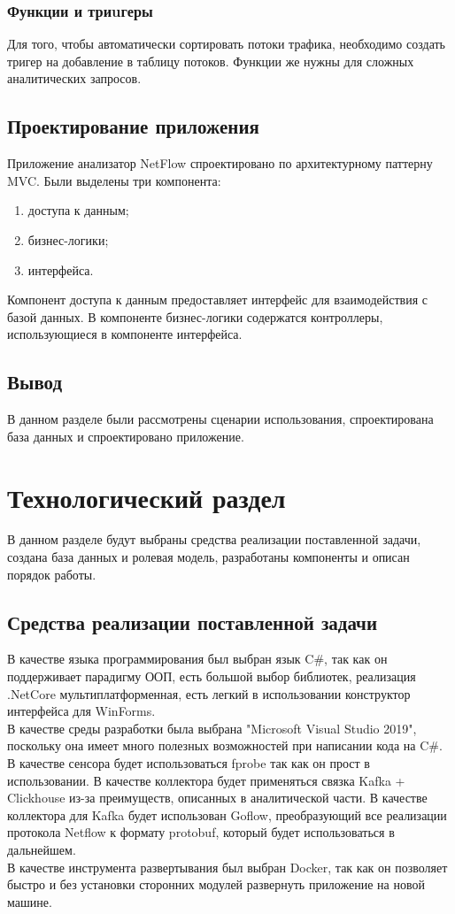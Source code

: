 \subsubsection{Функции и триuгеры}
Для того, чтобы автоматически сортировать потоки трафика, необходимо создать тригер на добавление в таблицу потоков. Функции же нужны для сложных аналитических запросов.

\subsection{Проектирование приложения}
Приложение анализатор NetFlow спроектировано по архитектурному паттерну MVC.
Были выделены три компонента:
\begin{enumerate}
	\item доступа к данным;
	\item бизнес-логики;
	\item интерфейса.
\end{enumerate}
Компонент доступа к данным предоставляет интерфейс для взаимодействия с базой данных. В компоненте бизнес-логики содержатся контроллеры, использующиеся в компоненте интерфейса.
\subsection{Вывод}
В данном разделе были рассмотрены сценарии использования, спроектирована база данных и спроектировано приложение.

\newpage
\section{Технологический раздел}
В данном разделе будут выбраны средства реализации поставленной задачи, создана база данных и ролевая модель, разработаны компоненты и описан порядок работы.
\subsection{Средства реализации поставленной задачи}
В качестве языка программирования был выбран язык C\#, так как он поддерживает парадигму ООП, есть большой выбор библиотек, реализация .NetCore мультиплатформенная, есть легкий в использовании конструктор интерфейса для WinForms\cite{sharp}. \\
В качестве среды разработки была выбрана "Microsoft Visual Studio 2019"\cite{vs}, поскольку она имеет много полезных возможностей при написании кода на C\#\cite{vs}. \\
В качестве сенсора будет использоваться fprobe так как он прост в использовании. В качестве коллектора будет применяться связка Kafka + Clickhouse из-за преимуществ, описанных в аналитической части. В качестве коллектора для Kafka будет использован Goflow, преобразующий все реализации протокола Netflow к формату protobuf, который будет использоваться в дальнейшем. \\
В качестве инструмента развертывания был выбран Docker, так как он позволяет быстро и без установки сторонних модулей развернуть приложение на новой машине.
